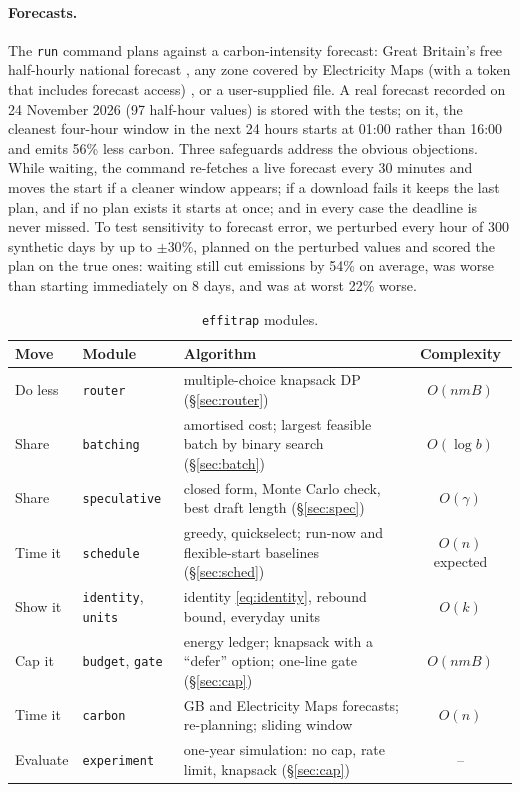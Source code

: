 \documentclass[11pt]{article}
\theoremstyle{definition}
\theoremstyle{remark}
\begin{document}
\paragraph{Forecasts.} The \texttt{run} command plans against a carbon-intensity forecast: Great Britain's free half-hourly national forecast \citep{carbonintensity}, any zone covered by Electricity Maps (with a token that includes forecast access) \citep{electricitymaps}, or a user-supplied file. A real forecast recorded on 24 November 2026 (97 half-hour values) is stored with the tests; on it, the cleanest four-hour window in the next 24 hours starts at 01:00 rather than 16:00 and emits 56\% less carbon. Three safeguards address the obvious objections. While waiting, the command re-fetches a live forecast every 30 minutes and moves the start if a cleaner window appears; if a download fails it keeps the last plan, and if no plan exists it starts at once; and in every case the deadline is never missed. To test sensitivity to forecast error, we perturbed every hour of 300 synthetic days by up to $\pm30\%$, planned on the perturbed values and scored the plan on the true ones: waiting still cut emissions by 54\% on average, was worse than starting immediately on 8 days, and was at worst 22\% worse.

\begin{table}[h]
\centering\small
\caption{\texttt{effitrap} modules.}
\label{tab:modules}
\begin{tabularx}{\textwidth}{@{}llXc@{}}
\toprule
Move & Module & Algorithm & Complexity \\
\midrule
Do less & \texttt{router} & multiple-choice knapsack DP (\S\ref{sec:router}) & $O(nmB)$ \\
Share & \texttt{batching} & amortised cost; largest feasible batch by binary search (\S\ref{sec:batch}) & $O(\log b)$ \\
Share & \texttt{speculative} & closed form, Monte Carlo check, best draft length (\S\ref{sec:spec}) & $O(\gamma)$ \\
Time it & \texttt{schedule} & greedy, quickselect; run-now and flexible-start baselines (\S\ref{sec:sched}) & $O(n)$ expected \\
Show it & \texttt{identity}, \texttt{units} & identity \eqref{eq:identity}, rebound bound, everyday units & $O(k)$ \\
Cap it & \texttt{budget}, \texttt{gate} & energy ledger; knapsack with a ``defer'' option; one-line gate (\S\ref{sec:cap}) & $O(nmB)$ \\
Time it & \texttt{carbon} & GB and Electricity Maps forecasts; re-planning; sliding window & $O(n)$ \\
Evaluate & \texttt{experiment} & one-year simulation: no cap, rate limit, knapsack (\S\ref{sec:cap}) & -- \\
\bottomrule
\end{tabularx}
\end{table}
\end{document}
